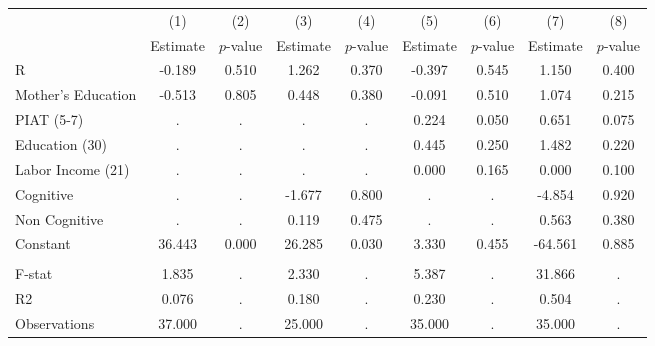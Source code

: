 \begin{tabular}{lcccccccc} \toprule
 & (1) & (2) & (3) & (4) & (5) & (6) & (7) & (8) \\ 
 & Estimate  & $p$-value  & Estimate  & $p$-value  & Estimate  & $p$-value  & Estimate  & $p$-value  \\  \midrule
R &    -0.189 &     0.510 &     1.262 &     0.370 &    -0.397 &     0.545 &     1.150 &     0.400 \\  
Mother's Education &    -0.513 &     0.805 &     0.448 &     0.380 &    -0.091 &     0.510 &     1.074 &     0.215 \\  
PIAT (5-7) &         . &         . &         . &         . &     0.224 &     0.050 &     0.651 &     0.075 \\  
Education (30) &         . &         . &         . &         . &     0.445 &     0.250 &     1.482 &     0.220 \\  
Labor Income (21) &         . &         . &         . &         . &     0.000 &     0.165 &     0.000 &     0.100 \\  
Cognitive &         . &         . &    -1.677 &     0.800 &         . &         . &    -4.854 &     0.920 \\  
Non Cognitive &         . &         . &     0.119 &     0.475 &         . &         . &     0.563 &     0.380 \\  
Constant &    36.443 &     0.000 &    26.285 &     0.030 &     3.330 &     0.455 &   -64.561 &     0.885 \\  \\ \mdirule
F-stat &     1.835 &         . &     2.330 &         . &     5.387 &         . &    31.866 &         . \\  
R2 &     0.076 &         . &     0.180 &         . &     0.230 &         . &     0.504 &         . \\  
Observations &    37.000 &         . &    25.000 &         . &    35.000 &         . &    35.000 &         . \\  
\bottomrule \end{tabular}
